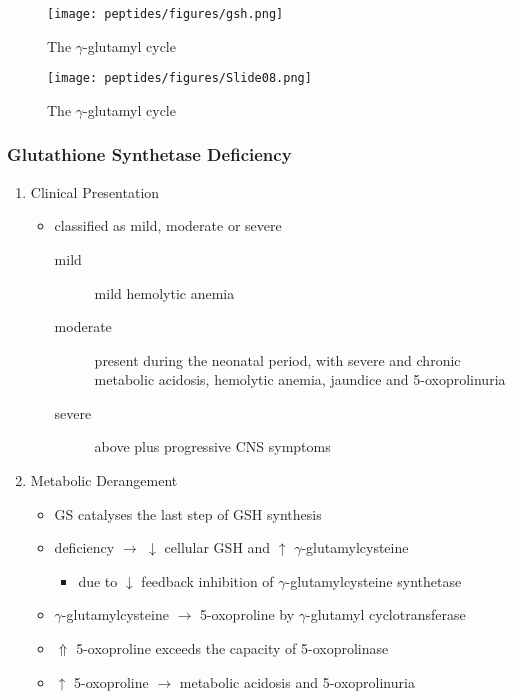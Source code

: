 \documentclass[12pt]{scrartcl}
\begin{document}
\begin{figure}[htbp]
\centering
\texttt{[image: peptides/figures/gsh.png]}
\caption{\label{fig:org251896d}The \(\gamma\)-glutamyl cycle}
\end{figure}


\begin{figure}[htbp]
\centering
\texttt{[image: peptides/figures/Slide08.png]}
\caption{\label{fig:org362bf63}The \(\gamma\)-glutamyl cycle}
\end{figure}


\subsubsection{Glutathione Synthetase Deficiency}
\label{sec:org8fb2487}
\begin{enumerate}
\item Clinical Presentation
\label{sec:org678f1b0}
\begin{itemize}
\item classified as mild, moderate or severe
\begin{description}
\item[{mild}] mild hemolytic anemia
\item[{moderate}] present during the neonatal period, with severe and
chronic metabolic acidosis, hemolytic anemia, jaundice
and 5-oxoprolinuria
\item[{severe}] above plus progressive CNS symptoms
\end{description}
\end{itemize}

\item Metabolic Derangement
\label{sec:org90617c1}
\begin{itemize}
\item GS catalyses the last step of GSH synthesis
\item deficiency \(\to\) \(\downarrow\) cellular GSH and \(\uparrow\) \(\gamma\)-glutamylcysteine
\begin{itemize}
\item due to \(\downarrow\) feedback inhibition of \(\gamma\)-glutamylcysteine synthetase
\end{itemize}
\item \(\gamma\)-glutamylcysteine \(\to\) 5-oxoproline by \(\gamma\)-glutamyl
cyclotransferase
\item \(\Uparrow\) 5-oxoproline exceeds the capacity of 5-oxoprolinase
\item \(\uparrow\) 5-oxoproline \(\to\) metabolic acidosis and 5-oxoprolinuria
\end{itemize}


\end{enumerate}
\end{document}
